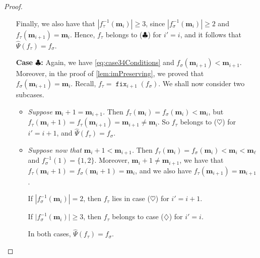 \documentclass[reqno]{amsart}
\theoremstyle{definition}
\newcommand{\fretherD}{\hat{\Psi}}
\newcommand{\caseOne}{\ensuremath{\heartsuit}}
\newcommand{\caseThree}{\ensuremath{\diamondsuit}}
\newcommand{\caseFour}{\ensuremath{\clubsuit}}
\newcommand{\img}{\mathbf{m}}
\DeclareMathOperator{\fixMap}{\mathtt{fix}}
\begin{document}
\begin{proof}
\begin{enumerate}[leftmargin=1.6cm]
		Finally, we also have that $|f_\tau^{-1}(\img_i)| \geq 3$,
		since $|f_\sigma^{-1}(\img_i)|\geq 2$ and $f_\tau(\img_{i+1})=\img_i$. 
		Hence, $f_\tau$ belongs to (\caseFour) for $i'=i$,
		and it follows that $\fretherD(f_\tau)=f_\sigma$.
		
		\item[\textbf{Case \caseFour:}] 
		Again, we have \eqref{eq:case34Conditions} and $f_\sigma(\img_{i+1})<\img_{i+1}$.
		Moreover, in the proof of \cref{lem:imPreserving},
		we proved that $f_\sigma(\img_{i+1})=\img_{i}$.
		Recall, $f_\tau = \fixMap_{i+1}(f_\sigma)$.
		We shall now consider two subcases.
		\begin{itemize}
			\item \emph{Suppose $\img_i+1=\img_{i+1}$.} 
			Then $f_\tau(\img_i)=f_\sigma(\img_i)<\img_i$, but 
			$f_\tau(\img_i+1)=f_\tau(\img_{i+1})=\img_{i+1}\neq 
			\img_i$. So $f_\tau$ belongs to (\caseOne) for $i'=i+1$,
			and $\fretherD(f_\tau)=f_\sigma$.
			
			\item \emph{Suppose now that $\img_i+1< \img_{i+1}$.}
			Then $f_\tau(\img_i)=f_\sigma(\img_i)<\img_i<\img_\ell$
			and $f_\sigma^{-1}(1)=\{1,2\}$. %
			Moreover, $\img_i+1 \neq  \img_{i+1}$, we have that 
			$f_\tau(\img_i+1)=f_\sigma(\img_i+1)=\img_i$,
			and we also have $f_\tau(\img_{i+1})=\img_{i+1}$.
			
			If $|f_\sigma^{-1}(\img_i)|=2$, 
			then $f_\tau$ lies in case (\caseOne) for $i'=i+1$.
			
			If $\vert f_\sigma^{-1}(\img_i)\vert\geq 3$, 
			then $f_\tau$ belongs to case (\caseThree) for $i'=i$.
			
			In both cases, $\fretherD(f_\tau)=f_\sigma$.
		\end{itemize}
	\end{enumerate}
\end{proof}
\end{document}
